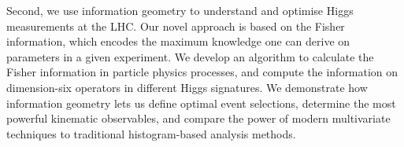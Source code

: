 Second, we use information geometry to understand and optimise Higgs
measurements at the LHC. Our novel approach is based on the Fisher
information, which encodes the maximum knowledge one can derive on
parameters in a given experiment. We develop an algorithm to calculate
the Fisher information in particle physics processes, and compute the
information on dimension-six operators in different Higgs signatures.
We demonstrate how information geometry lets us define optimal event
selections, determine the most powerful kinematic observables, and
compare the power of modern multivariate techniques to traditional
histogram-based analysis methods.
